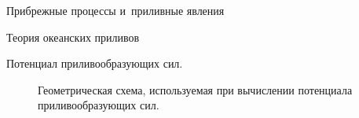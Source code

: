 \begin{chapter}{Прибрежные процессы и~приливные явления}
\begin{section}{Теория океанских приливов}
\begin{paragraph}{Потенциал приливообразующих сил.}
\begin{figure}[h!]
\caption{Геометрическая схема, используемая при вычислении потенциала 
приливообразующих сил.}
\label{fig:tidesketch}
\end{figure}
%
%


\end{paragraph}
\end{section}
\end{chapter}
